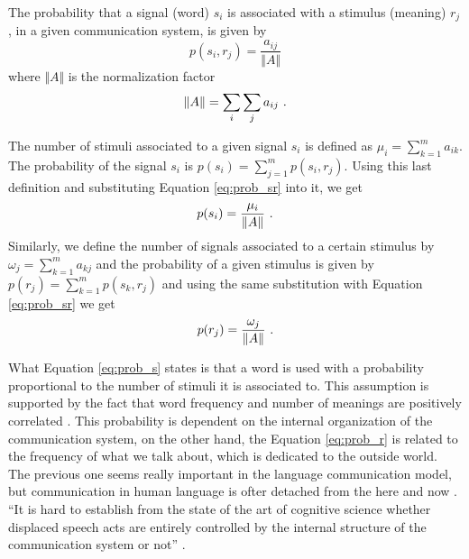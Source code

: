 The probability that a signal (word) $s_i$ is associated with a stimulus (meaning) $r_j$,
in a given communication system, is given by
\begin{equation}
p(s_i, r_j) = \frac{a_{ij}}{\Vert A \Vert}
\label{eq:prob_sr}
\end{equation}
where $\Vert A \Vert$ is the normalization factor 
\begin{equation}
\Vert A \Vert = \sum_i \sum_j a_{ij} \textmd{ .}
\end{equation}

The number of stimuli associated to a given signal $s_i$ is defined as
$\mu_i = \sum_{k=1}^m a_{ik}$. The probability of the signal $s_i$ is 
$p(s_i) = \sum_{j=1}^m p(s_i, r_j)$. Using this last definition and
substituting Equation \ref{eq:prob_sr} into it, we get
\begin{equation}
p(s_i) = \frac{\mu_i}{\Vert A \Vert} \textmd{ .}
\label{eq:prob_s}
\end{equation} 
Similarly, we define the number of signals associated to a certain stimulus
by $\omega_j = \sum_{k=1}^m a_{kj}$ and the probability of a given stimulus
is given by $p(r_j) = \sum_{k=1}^m p(s_k , r_j)$ and using the same substitution
with Equation \ref{eq:prob_sr} we get
\begin{equation}
p(r_j) = \frac{\omega_j}{\Vert A \Vert} \textmd{ .}
\label{eq:prob_r}
\end{equation}

What Equation \ref{eq:prob_s} states is that a word is used with a probability 
proportional to the number of stimuli it is associated to. This assumption is
supported by the fact that word frequency and number of meanings are positively
correlated \citep{manning1999}. This probability is dependent on the internal
organization of the communication system, on the other hand, the Equation
\ref{eq:prob_r} is related to the frequency of what we talk about, which is
dedicated to the outside world. The previous one seems really important
in the language communication model, but communication in human language
is ofter detached from the here and now \citep{hockett1960}.
``It is hard to establish from the state of the art of cognitive science
whether displaced speech acts are entirely controlled by the internal structure
of the communication system or not'' \citep{cancho2006}.

